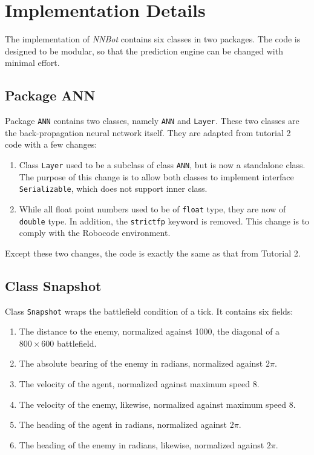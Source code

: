 \documentclass[11pt,a4paper]{article}
\begin{document}
\section{Implementation Details}

The implementation of \emph{NNBot} contains six classes in two packages. The code is designed to be modular, so that the prediction engine can be changed with minimal effort.

\subsection{Package ANN}

Package \texttt{ANN} contains two classes, namely \texttt{ANN} and \texttt{Layer}. These two classes are the back-propagation neural network itself. They are adapted from tutorial 2 code with a few changes:

\begin{enumerate}[itemsep=0mm]
\item Class \texttt{Layer} used to be a subclass of class \texttt{ANN}, but is now a standalone class. The purpose of this change is to allow both classes to implement interface \texttt{Serializable}, which does not support inner class.
\item While all float point numbers used to be of \texttt{float} type, they are now of \texttt{double} type. In addition, the \texttt{strictfp} keyword is removed. This change is to comply with the Robocode environment.
\end{enumerate}

Except these two changes, the code is exactly the same as that from Tutorial 2.

\subsection{Class Snapshot}

Class \texttt{Snapshot} wraps the battlefield condition of a tick. It contains six fields:

\begin{enumerate}[itemsep=-0.5mm]
\item The distance to the enemy, normalized against 1000, the diagonal of a $800\times600$ battlefield.
\item The absolute bearing of the enemy in radians, normalized against $2\pi.$
\item The velocity of the agent, normalized against maximum speed 8.
\item The velocity of the enemy, likewise, normalized against maximum speed 8.
\item The heading of the agent in radians, normalized against $2\pi.$
\item The heading of the enemy in radians, likewise, normalized against $2\pi.$
\end{enumerate}
\end{document}
